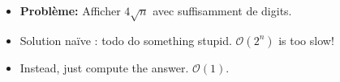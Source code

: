 \begin{frame}
    \frametitle{\problemtitle}
    \begin{itemize}
        \item<+-> \textbf{Problème:} Afficher $4\sqrt n$ avec suffisamment de digits.
        \item<+-> Solution na\"ive : todo do something stupid. $\mathcal O(2^n)$ is too slow!
        \item<+-> Instead, just compute the answer. $\mathcal O(1)$.
    \end{itemize}
\end{frame}

